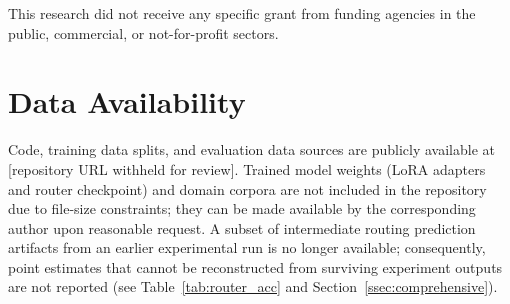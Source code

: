 \documentclass[a4paper,fleql,doubleblind]{cas-sc}
\begin{document}
This research did not receive any specific grant from funding agencies in
the public, commercial, or not-for-profit sectors.

\section*{Data Availability}
Code, training data splits, and evaluation data sources are publicly available
at [repository URL withheld for review]. Trained model weights (LoRA
adapters and router checkpoint) and domain corpora are not included in the
repository due to file-size constraints; they can be made available by the
corresponding author upon reasonable request.
A subset of intermediate routing prediction artifacts from an earlier
experimental run is no longer available; consequently, point estimates that
cannot be reconstructed from surviving experiment outputs are not reported
(see Table~\ref{tab:router_acc} and Section~\ref{ssec:comprehensive}).
\end{document}
